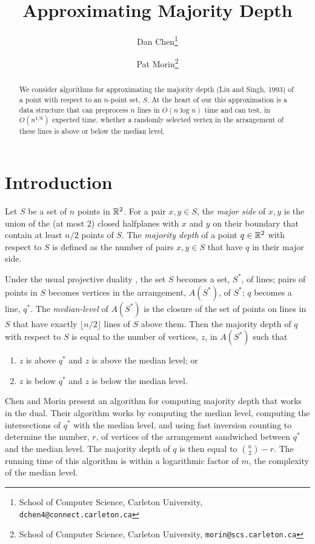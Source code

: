 \documentclass{cccg12}
\title{Approximating Majority Depth}
\author{Dan Chen\thanks{School of Computer Science,
  Carleton University, {\tt dchen4@connect.carleton.ca}}
  \and Pat Morin\thanks{School of Computer Science,
  Carleton University, {\tt morin@scs.carleton.ca}}}
\begin{document}
\thispagestyle{empty}
\maketitle

\begin{abstract}
We consider algorithms for approximating the majority depth (Liu and
Singh, 1993) of a point with respect to an $n$-point set, $S$.  At the
heart of our this approximation is a data structure that can preprocess
$n$ lines in $O(n\log n)$ time and can test, in $O(n^{1/6})$ expected
time, whether a randomly selected vertex in the arrangement of these
lines is above or below the median level.
\end{abstract}

\section{Introduction}

Let $S$ be a set of $n$ points in $\mathbb{R}^2$.  For a pair $x,y\in S$,
the \emph{major side} of $x,y$ is the union of the (at most 2) closed
halfplanes with $x$ and $y$ on their boundary that contain at least
$n/2$ points of $S$.  The \emph{majority depth} \cite{ls93,s91} of a
point $q\in\mathbb{R}^2$ with respect to $S$ is defined as the number of pairs
$x,y\in S$ that have $q$ in their major side.

Under the usual projective duality \cite{e97}, the set $S$ becomes
a set, $S^*$, of lines; pairs of points in $S$ becomes vertices
in the arrangement, $A(S^*)$, of $S^*$; $q$ becomes a line, $q^*$.
The \emph{median-level} of $A(S^*)$ is the closure of the set of points
on lines in $S$ that have exactly $\lfloor n/2\rfloor$ lines of $S$
above them.  Then the majority depth of $q$ with respect to $S$ is equal
to the number of vertices, $z$, in $A(S^*)$ such that
\begin{enumerate}
\item $z$ is above $q^*$ and $z$ is above the median level; or
\item $z$ is below $q^*$ and $z$ is below the median level.
\end{enumerate}

Chen and Morin \cite{cm11} present an algorithm for computing majority
depth that works in the dual.  Their algorithm works by computing the
median level, computing the intersections of $q^*$ with the median
level, and using fast inversion counting to determine the number, $r$,
of vertices of the arrangement sandwiched between $q^*$ and the median
level.  The majority depth of $q$ is then equal to $\binom{n}{2}-r$.
The running time of this algorithm is within a logarithmic factor of $m$,
the complexity of the median level.
\end{document}
